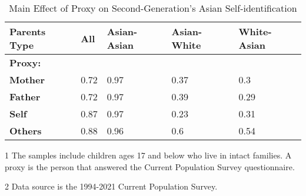 \begin{table}[H]
\centering\centering
\caption{Main Effect of Proxy on Second-Generation's Asian Self-identification \label{tab:hispbyproxy}}
\centering
\fontsize{12}{14}\selectfont
\begin{threeparttable}
\begin{tabular}[c]{>{}lllll}
\toprule
Parents Type & All & Asian-Asian & Asian-White & White-Asian\\
\midrule
\textbf{Proxy:} &  &  &  & \\
\hspace{1em}\textbf{Mother} & 0.72 & 0.97 & 0.37 & 0.3\\
\hspace{1em}\textbf{Father} & 0.72 & 0.97 & 0.39 & 0.29\\
\hspace{1em}\textbf{Self} & 0.87 & 0.97 & 0.23 & 0.31\\
\hspace{1em}\textbf{Others} & 0.88 & 0.96 & 0.6 & 0.54\\
\bottomrule
\end{tabular}
\begin{tablenotes}
\item[1] The samples include children ages 17 and below who live in intact families. A proxy is the person that answered the Current Population Survey questionnaire.
\item[2] Data source is the 1994-2021 Current Population Survey.
\end{tablenotes}
\end{threeparttable}
\end{table}
